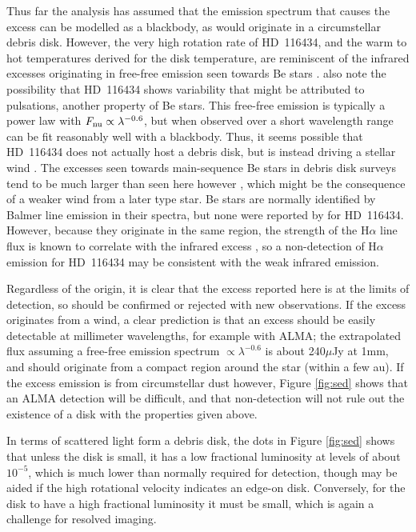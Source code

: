 \documentclass[a4paper,fleqn,usenatbib]{mnras}
\begin{document}
Thus far the analysis has assumed that the emission spectrum that causes
the excess can be modelled as a blackbody, as would originate in a
circumstellar debris disk. However, the very high rotation rate of
HD~116434, and the warm to hot temperatures derived for the disk
temperature, are reminiscent of the infrared excesses originating in
free-free emission seen towards Be stars
\citep{1970A&A.....9..252W,1974ApJ...191..675G}. \citet{2017arXiv170701413C}
also note the possibility that HD~116434 shows variability that might be
attributed to pulsations, another property of Be stars. This free-free
emission is typically a power law with
$F_{\rm nu} \propto \lambda^{-0.6}$, but when observed over a short
wavelength range can be fit reasonably well with a blackbody. Thus, it
seems possible that HD~116434 does not actually host a debris disk, but
is instead driving a stellar wind \citep[estimated to be
$10^{-8} M_\odot$ year$^{-1}$ using eq (24) from ][the same as estimated
for Fomalhaut by \citet{2012A&A...540A.125A}]{1975A&A....39....1P}. The
excesses seen towards main-sequence Be stars in debris disk surveys tend
to be much larger than seen here however
\citep[e.g.][]{2006ApJ...653..675S,2012ApJ...756..133C}, which might be
the consequence of a weaker wind from a later type star. Be stars are
normally identified by Balmer line emission in their spectra, but none
were reported by \citet{2017arXiv170701413C} for HD~116434. However,
because they originate in the same region, the strength of the H$\alpha$
line flux is known to correlate with the infrared excess
\citep{1982MNRAS.198..659N}, so a non-detection of H$\alpha$ emission
for HD~116434 may be consistent with the weak infrared emission.

Regardless of the origin, it is clear that the excess reported here is
at the limits of detection, so should be confirmed or rejected with new
observations. If the excess originates from a wind, a clear prediction
is that an excess should be easily detectable at millimeter wavelengths,
for example with ALMA; the extrapolated flux assuming a free-free
emission spectrum $\propto \lambda^{-0.6}$ is about 240$\mu$Jy at 1mm,
and should originate from a compact region around the star (within a few
au). If the excess emission is from circumstellar dust however, Figure
\ref{fig:sed} shows that an ALMA detection will be difficult, and that
non-detection will not rule out the existence of a disk with the
properties given above.

In terms of scattered light form a debris disk, the dots in Figure
\ref{fig:sed} shows that unless the disk is small, it has a low
fractional luminosity at levels of about $10^{-5}$, which is much lower
than normally required for detection, though may be aided if the high
rotational velocity indicates an edge-on disk. Conversely, for the disk
to have a high fractional luminosity it must be small, which is again a
challenge for resolved imaging.
\end{document}
